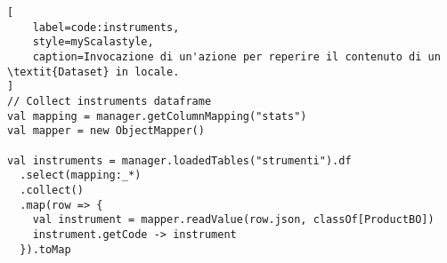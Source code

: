 \begin{lstlisting}[
    label=code:instruments,
    style=myScalastyle,
    caption=Invocazione di un'azione per reperire il contenuto di un \textit{Dataset} in locale.
]
// Collect instruments dataframe
val mapping = manager.getColumnMapping("stats")
val mapper = new ObjectMapper()

val instruments = manager.loadedTables("strumenti").df
  .select(mapping:_*)
  .collect()
  .map(row => {
    val instrument = mapper.readValue(row.json, classOf[ProductBO])
    instrument.getCode -> instrument
  }).toMap
\end{lstlisting}